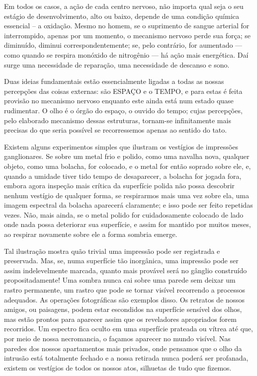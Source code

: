 \documentclass[11pt,a5paper,twoside,openany]{book}
\begin{document}
Em todos os casos, a ação de cada centro nervoso, não importa qual seja o seu estágio de desenvolvimento, alto ou baixo, depende de uma condição química essencial – a oxidação. Mesmo no homem, se o suprimento de sangue arterial for interrompido, apenas por um momento, o mecanismo nervoso perde sua força; se diminuído, diminui correspondentemente; se, pelo contrário, for aumentado — como quando se respira monóxido de nitrogênio — há ação mais energética. Daí surge uma necessidade de reparação, uma necessidade de descanso e sono.

Duas ideias fundamentais estão essencialmente ligadas a todas as nossas percepções das coisas externas: são ESPAÇO e o TEMPO, e para estas é feita provisão no mecanismo nervoso enquanto este ainda está num estado quase rudimentar. O olho é o órgão do espaço, o ouvido do tempo; cujas percepções, pelo elaborado mecanismo dessas estruturas, tornam-se infinitamente mais precisas do que seria possível se recorressemos apenas ao sentido do tato.

Existem alguns experimentos simples que ilustram os vestígios de impressões ganglionares. Se sobre um metal frio e polido, como uma navalha nova, qualquer objeto, como uma bolacha, for colocado, e o metal for então soprado sobre ele, e, quando a umidade tiver tido tempo de desaparecer, a bolacha for jogada fora, embora agora inspeção mais crítica da superfície polida não possa descobrir nenhum vestígio de qualquer forma, se respirarmos mais uma vez sobre ela, uma imagem espectral da bolacha aparecerá claramente; e isso pode ser feito repetidas vezes. Não, mais ainda, se o metal polido for cuidadosamente colocado de lado onde nada possa deteriorar sua superfície, e assim for mantido por muitos meses, ao respirar novamente sobre ele a forma sombria emerge.

Tal ilustração mostra quão trivial uma impressão pode ser registrada e preservada. Mas, se, numa superfície tão inorgânica, uma impressão pode ser assim indelevelmente marcada, quanto mais provável será no gânglio construído propositadamente! Uma sombra nunca cai sobre uma parede sem deixar um rastro permanente, um rastro que pode se tornar visível recorrendo a processos adequados. As operações fotográficas são exemplos disso. Os retratos de nossos amigos, ou paisagens, podem estar escondidos na superfície sensível dos olhos, mas estão prontos para aparecer assim que os reveladores apropriados forem recorridos. Um espectro fica oculto em uma superfície prateada ou vítrea até que, por meio de nossa necromancia, o façamos aparecer no mundo visível. Nas paredes dos nossos apartamentos mais privados, onde pensamos que o olho da intrusão está totalmente fechado e a nossa retirada nunca poderá ser profanada, existem os vestígios de todos os nossos atos, silhuetas de tudo que fizemos.
\end{document}
